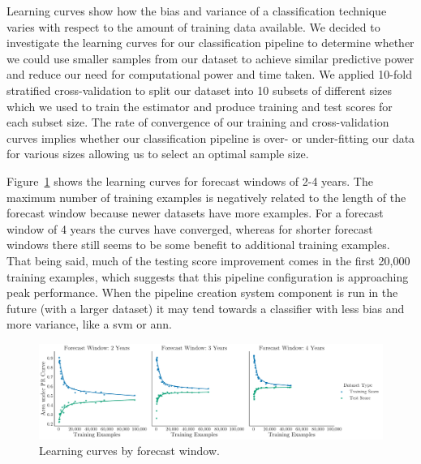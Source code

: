 ﻿\documentclass[../thesis/thesis.tex]{subfiles}
\begin{document}
Learning curves show how the bias and variance of a classification technique varies with respect to the amount of training data available. We decided to investigate the learning curves for our classification pipeline to determine whether we could use smaller samples from our dataset to achieve similar predictive power and reduce our need for computational power and time taken. We applied 10-fold stratified cross-validation to split our dataset into 10 subsets of different sizes which we used to train the estimator and produce training and test scores for each subset size. The rate of convergence of our training and cross-validation curves implies whether our classification pipeline is over- or under-fitting our data for various sizes allowing us to select an optimal sample size.

Figure~\ref{fig:evaluation:learning_window} shows the learning curves for forecast windows of 2-4 years. The maximum number of training examples is negatively related to the length of the forecast window because newer datasets have more examples. For a forecast window of 4 years the curves have converged, whereas for shorter forecast windows there still seems to be some benefit to additional training examples. That being said, much of the testing score improvement comes in the first 20,000 training examples, which suggests that this pipeline configuration is approaching peak performance. When the pipeline creation system component is run in the future (with a larger dataset) it may tend towards a classifier with less bias and more variance, like a \gls{svm} or \gls{ann}.

\begin{figure}[!htb]
    \centering
    \includegraphics[width=\textwidth]{../figures/evaluation/learning_curves_window}
    \caption[Learning curves by forecast window]{Learning curves by forecast window.}
    \label{fig:evaluation:learning_window}
\end{figure}
\end{document}
